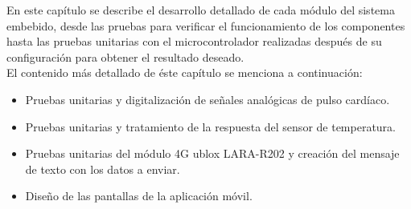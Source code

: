 En este capítulo se describe el desarrollo detallado de cada módulo del sistema embebido, desde las pruebas para verificar el funcionamiento de los componentes hasta las pruebas unitarias con el microcontrolador realizadas después de su configuración para obtener el resultado deseado. \\

El contenido más detallado de éste capítulo se menciona a continuación:

\begin{itemize}
	\item Pruebas unitarias y digitalización de señales analógicas de pulso cardíaco.
	\item Pruebas unitarias y tratamiento de la respuesta del sensor de temperatura.
	\item Pruebas unitarias del módulo 4G ublox LARA-R202 y creación del mensaje de texto con los datos a enviar.
	\item Diseño de las pantallas de la aplicación móvil.
\end{itemize}
\newpage

